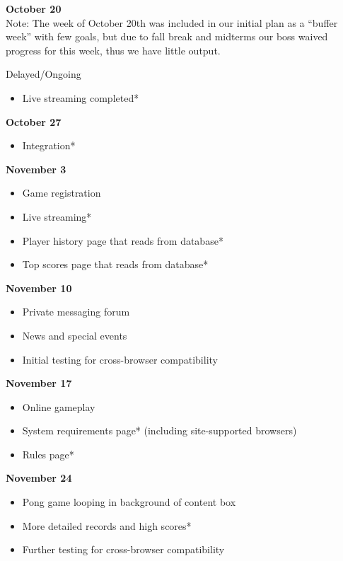 \begin{description}
				\item \textbf{October 20}
				\\Note: The week of October 20th was included in our initial plan as a “buffer week” with few goals, but due to fall break and midterms our boss waived progress for this week, thus we have little output.
				\begin{description}
					\item Delayed/Ongoing
					\begin{itemize}
						\item Live streaming completed*
					\end{itemize}
				\end{description}
				
				\item \textbf{October 27}
				\begin{itemize}
					\item Integration*
				\end{itemize}
				
				\item \textbf{November 3}
				\begin{itemize}
					\item Game registration
					\item Live streaming*
					\item Player history page that reads from database*
					\item Top scores page that reads from database*
				\end{itemize}
				
				\item \textbf{November 10}
				\begin{itemize}
					\item Private messaging forum
					\item News and special events
					\item Initial testing for cross-browser compatibility
				\end{itemize}

				
				\item \textbf{November 17}
				\begin{itemize}
					\item Online gameplay
					\item System requirements page* (including site-supported browsers)
					\item Rules page*
				\end{itemize}
				
				\item \textbf{November 24}
				\begin{itemize}
					\item Pong game looping in background of content box
					\item More detailed records and high scores*
					\item Further testing for cross-browser compatibility
				\end{itemize}
				

\end{description}
